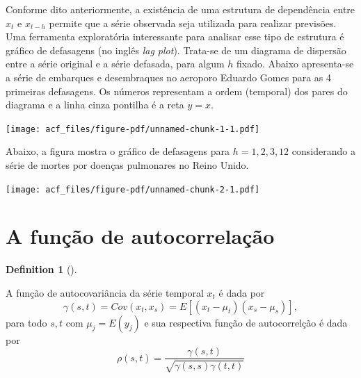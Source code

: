 \documentclass[
  letterpaper,
  DIV=11,
  numbers=noendperiod]{scrreprt}
\theoremstyle{definition}
\newtheorem{definition}{Definition}[chapter]
\theoremstyle{plain}
\theoremstyle{definition}
\theoremstyle{remark}
\begin{document}
Conforme dito anteriormente, a existência de uma estrutura de
dependência entre \(x_t\) e \(x_{t-h}\) permite que a série observada
seja utilizada para realizar previsões. Uma ferramenta exploratória
interessante para analisar esse tipo de estrutura é gráfico de
defasagens (no inglês \emph{lag plot}). Trata-se de um diagrama de
dispersão entre a série original e a série defasada, para algum \(h\)
fixado. Abaixo apresenta-se a série de embarques e desembraques no
aeroporo Eduardo Gomes para as 4 primeiras defasagens. Os números
representam a ordem (temporal) dos pares do diagrama e a linha cinza
pontilha é a reta \(y=x\).

\texttt{[image: acf\_files/figure-pdf/unnamed-chunk-1-1.pdf]}

Abaixo, a figura mostra o gráfico de defasagens para \(h=1,2,3,12\)
considerando a série de mortes por doenças pulmonares no Reino Unido.

\texttt{[image: acf\_files/figure-pdf/unnamed-chunk-2-1.pdf]}

\hypertarget{a-funuxe7uxe3o-de-autocorrelauxe7uxe3o}{%
\section{A função de
autocorrelação}\label{a-funuxe7uxe3o-de-autocorrelauxe7uxe3o}}

\begin{definition}[]\protect\hypertarget{def-autocovariancia}{}\label{def-autocovariancia}

A função de autocovariância da série temporal \(x_t\) é dada por
\[\begin{equation}
          \gamma(s,t) = Cov(x_t,x_s)=E\left[(x_t-\mu_t)(x_s-\mu_s)\right],
        \end{equation}\] para todo \(s,t\) com \(\mu_j=E(y_j)\) e sua
respectiva função de autocorrelção é dada por \[\begin{equation}
        \rho(s,t)=\frac{\gamma(s,t)}{\sqrt{\gamma(s,s)\gamma(t,t)}}
        \end{equation}\]

\end{definition}
\end{document}

